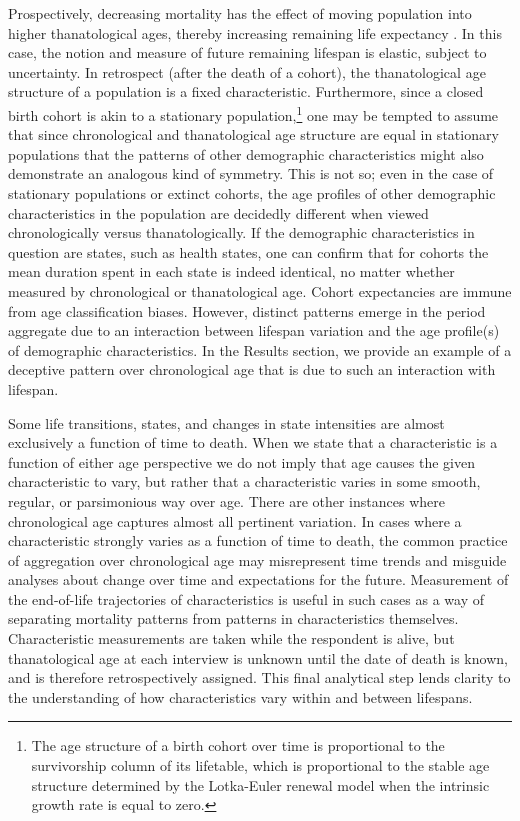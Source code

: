\documentclass[11pt,oneside]{article} %
\begin{document}
Prospectively, decreasing mortality has the effect of moving population into higher thanatological ages, thereby increasing
remaining life expectancy \citep{sanderson2005average}. In this case,
the notion and measure of future remaining lifespan is elastic, subject to uncertainty.
In retrospect (after the death of a cohort), the thanatological age structure of
a population is a fixed characteristic. Furthermore, since a closed birth cohort
is akin to a stationary population,\footnote{The age structure of a birth cohort
over time is proportional to the survivorship column of its lifetable, which is
proportional to the stable age structure determined by the Lotka-Euler renewal
model when the intrinsic growth rate is equal to zero.} one may be
tempted to assume that since chronological and thanatological age structure are equal in
stationary populations \citep{brouard1989mouvements,vaupel2009life,pancho2015}
that the patterns of other demographic characteristics might also demonstrate an
analogous kind of symmetry.
This is not so; even in the case of stationary populations or extinct cohorts,
the age profiles of other demographic characteristics in the population are decidedly different when
viewed chronologically versus thanatologically. If the demographic
characteristics in question are states, such as health states, one can confirm
that for cohorts the mean duration spent in each state is indeed identical, no
matter whether measured by chronological or thanatological age. Cohort
expectancies are immune from age classification biases. However, distinct
patterns emerge in the period aggregate due to an interaction between lifespan variation and the age profile(s) of demographic characteristics. In the Results section, we provide an example of a deceptive pattern over chronological age that is due to such an interaction with lifespan.

Some life
transitions, states, and changes in state intensities are almost exclusively a
function of time to death. When we state that a characteristic is a
function of either age perspective we do not imply that age causes the given characteristic to vary, but rather that a characteristic varies in some smooth, regular, or parsimonious way over age. There are other instances where chronological age captures almost all pertinent variation. In cases where a characteristic strongly varies as a
function of time to death,
the common practice of aggregation over chronological age may misrepresent time
trends and misguide analyses about change over time and expectations for the
future. Measurement of the
end-of-life trajectories of characteristics is useful in such cases as a way of separating
mortality patterns from patterns in characteristics themselves.
Characteristic measurements are taken while the respondent is alive, but
thanatological age at each interview is unknown until the date of death is
known, and is therefore retrospectively assigned. This final analytical step
lends clarity to the understanding of how characteristics vary within and
between lifespans.
\end{document}
